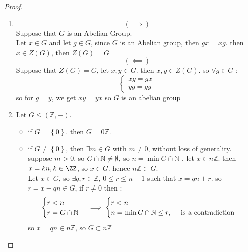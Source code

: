\begin{proof}
  \begin{enumerate}
  \item 
\[
( \implies ) 
\]
Suppose that $G $ is an Abelian Group. \\
Let $x \in  G $ and let $g \in G $, since $G $ is an Abelian group, then $gx = xg $. then $x \in  Z(G)$,
then $Z(G) = G$
\[
 ( \impliedby  ) 
\]
Suppose that $Z(G) = G$, let $x,y \in  G$. then $x,y \in Z(G)$. so $\forall g \in G$ :
\[
\begin{cases}
xg = gx \\
yg = gy
\end{cases}
\]
so for $g = y$, we get $xy = yx $ so $G $ is an abelian group 
\item 
  Let $G \leq (\mathbb{Z}, +)  $.  
  \begin{itemize}
    \item       if $G = \left\{ 0 \right\} $. then $G = 0 \mathbb{Z} $. 
      \item
  if $G \neq \left\{ 0 \right\} $, then $\exists m \in G $ with $m \neq 0$, without loss of generality.
  suppose $m > 0$, so $G \cap  \mathbb{N} \neq  \emptyset $, so $n = \min G \cap \mathbb{N} $ , let $x \in  n \mathbb{Z} $.
  then $x = kn, k \in  \ZZ$, so $x \in  G $. hence $n \mathbb{Z} \subset G $. \\
  Let $x \in  G $, so $\exists q,r \in  \mathbb{Z}$, $0 \leq r \leq  n-1$ such that 
  $x = qn + r $. so $r = x - qn \in  G $, if $r \neq  0 $ then : 
  \[
  \begin{cases}
  r < n \\
  r = G \cap \mathbb{N}
  \end{cases} \implies 
  \begin{cases}
  r < n \\
  n = \min  G \cap \mathbb{N} \leq r, \quad \text{ is a contradiction } 
  \end{cases}
  \]
  so $x = qn \in  n \mathbb{Z} $, so $G \subset n \mathbb{Z}$ 
  \end{itemize}
  \end{enumerate}
\end{proof}

